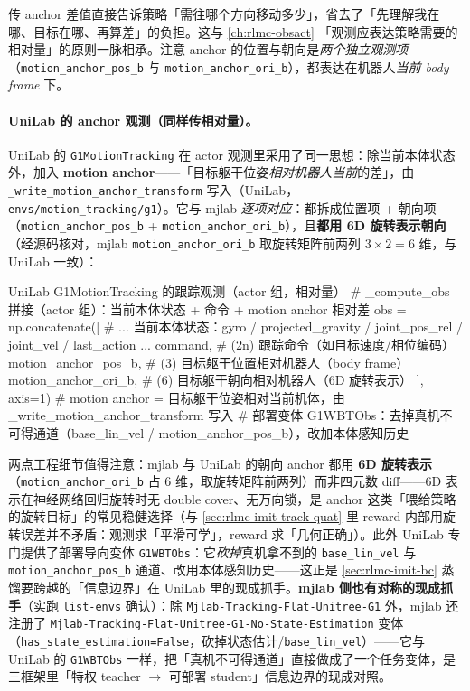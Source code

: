 传 anchor 差值直接告诉策略「需往哪个方向移动多少」，省去了「先理解我在哪、目标在哪、再算差」的负担。这与 \cref{ch:rlmc-obsact} 「观测应表达策略需要的相对量」的原则一脉相承。注意 anchor 的位置与朝向是\emph{两个独立观测项}（\verb|motion_anchor_pos_b| 与 \verb|motion_anchor_ori_b|），都表达在机器人\emph{当前 body frame} 下。

\paragraph{UniLab 的 anchor 观测（同样传相对量）。}UniLab 的 \verb|G1MotionTracking| 在 actor 观测里采用了同一思想：除当前本体状态外，加入 \textbf{motion anchor}——「目标躯干位姿\emph{相对机器人当前}的差」，由 \verb|_write_motion_anchor_transform| 写入（UniLab，\verb|envs/motion_tracking/g1|）。它与 mjlab \emph{逐项对应}：都拆成位置项 + 朝向项（\verb|motion_anchor_pos_b| + \verb|motion_anchor_ori_b|），且\textbf{都用 6D 旋转表示朝向}（经源码核对，mjlab \verb|motion_anchor_ori_b| 取旋转矩阵前两列 $3\times2=6$ 维，与 UniLab 一致）：

\begin{codebox}[Python]{UniLab G1MotionTracking 的跟踪观测（actor 组，相对量）}
# _compute_obs 拼接（actor 组）：当前本体状态 + 命令 + motion anchor 相对差
obs = np.concatenate([
    # ... 当前本体状态：gyro / projected_gravity / joint_pos_rel / joint_vel / last_action ...
    command,                 # (2n)  跟踪命令（如目标速度/相位编码）
    motion_anchor_pos_b,     # (3)   目标躯干位置相对机器人（body frame）
    motion_anchor_ori_b,     # (6)   目标躯干朝向相对机器人（6D 旋转表示）
], axis=1)
# motion anchor = 目标躯干位姿相对当前机体，由 _write_motion_anchor_transform 写入
# 部署变体 G1WBTObs：去掉真机不可得通道（base_lin_vel / motion_anchor_pos_b），改加本体感知历史
\end{codebox}

两点工程细节值得注意：mjlab 与 UniLab 的朝向 anchor 都用 \textbf{6D 旋转表示}（\verb|motion_anchor_ori_b| 占 6 维，取旋转矩阵前两列）而非四元数 diff——6D 表示在神经网络回归旋转时无 double cover、无万向锁，是 anchor 这类「喂给策略的旋转目标」的常见稳健选择（与 \cref{sec:rlmc-imit-track-quat} 里 reward 内部用旋转误差并不矛盾：观测求「平滑可学」，reward 求「几何正确」）。此外 UniLab 专门提供了部署导向变体 \verb|G1WBTObs|：它\emph{砍掉}真机拿不到的 \verb|base_lin_vel| 与 \verb|motion_anchor_pos_b| 通道、改用本体感知历史——这正是 \cref{sec:rlmc-imit-bc} 蒸馏要跨越的「信息边界」在 UniLab 里的现成抓手。\textbf{mjlab 侧也有对称的现成抓手}（实跑 \verb|list-envs| 确认）：除 \verb|Mjlab-Tracking-Flat-Unitree-G1| 外，mjlab 还注册了 \verb|Mjlab-Tracking-Flat-Unitree-G1-No-State-Estimation| 变体（\verb|has_state_estimation=False|，砍掉状态估计/\verb|base_lin_vel|）——它与 UniLab 的 \verb|G1WBTObs| 一样，把「真机不可得通道」直接做成了一个任务变体，是三框架里「特权 teacher $\to$ 可部署 student」信息边界的现成对照。

